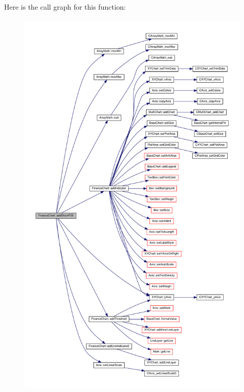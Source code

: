 Here is the call graph for this function\+:
\nopagebreak
\begin{figure}[H]
\begin{center}
\leavevmode
\includegraphics[height=550pt]{class_finance_chart_a8c44b07a3a6dcf2e3feb09960dfa9770_cgraph}
\end{center}
\end{figure}
\mbox{\label{class_finance_chart_ae08738c0df88ccd4d75ed3860f353839}} 
